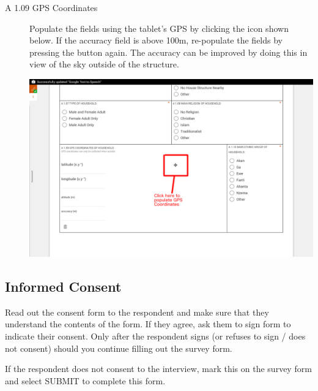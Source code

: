 \documentclass[a4paper]{refart}
\begin{document}
\begin{description}


\item[A 1.09 GPS Coordinates] Populate the fields using the tablet's GPS by clicking the icon shown below. If the accuracy field is above 100m, re-populate the fields by pressing the button again. The accuracy can be improved by doing this in view of the sky outside of the structure.

\includegraphics[width=\textwidth]{enketo2.png}


\end{description}

\subsection{Informed Consent}
Read out the consent form to the respondent and make sure that they understand the contents of the form. If they agree, ask them to sign form to indicate their consent. Only after the respondent signs (or refuses to sign / does not consent) should you continue filling out the survey form.

If the respondent does not consent to the interview, mark this on the survey form and select SUBMIT to complete this form.
\end{document}

